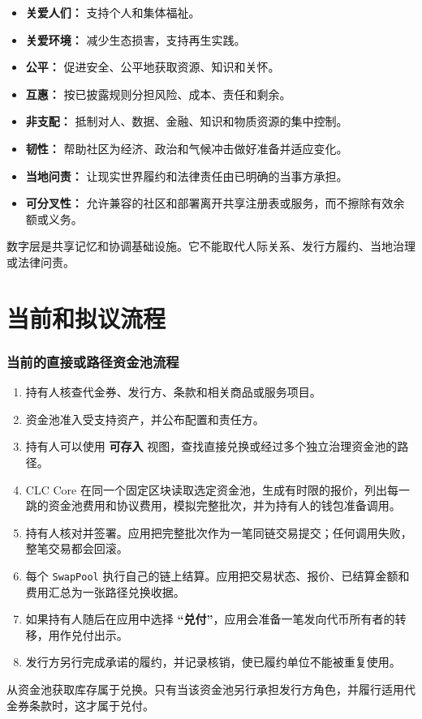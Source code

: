\documentclass[11pt]{article}
\begin{document}
\begin{itemize}[leftmargin=*]
\item \textbf{关爱人们：} 支持个人和集体福祉。
\item \textbf{关爱环境：} 减少生态损害，支持再生实践。
\item \textbf{公平：} 促进安全、公平地获取资源、知识和关怀。
\item \textbf{互惠：} 按已披露规则分担风险、成本、责任和剩余。
\item \textbf{非支配：} 抵制对人、数据、金融、知识和物质资源的集中控制。
\item \textbf{韧性：} 帮助社区为经济、政治和气候冲击做好准备并适应变化。
\item \textbf{当地问责：} 让现实世界履约和法律责任由已明确的当事方承担。
\item \textbf{可分叉性：} 允许兼容的社区和部署离开共享注册表或服务，而不擦除有效余额或义务。
\end{itemize}
数字层是共享记忆和协调基础设施。它不能取代人际关系、发行方履约、当地治理或法律问责。

\section*{当前和拟议流程}

\subsubsection*{当前的直接或路径资金池流程}

\begin{enumerate}[leftmargin=*]
\item 持有人核查代金券、发行方、条款和相关商品或服务项目。
\item 资金池准入受支持资产，并公布配置和责任方。
\item 持有人可以使用 \textbf{可存入} 视图，查找直接兑换或经过多个独立治理资金池的路径。
\item CLC Core 在同一个固定区块读取选定资金池，生成有时限的报价，列出每一跳的资金池费用和协议费用，模拟完整批次，并为持有人的钱包准备调用。
\item 持有人核对并签署。应用把完整批次作为一笔同链交易提交；任何调用失败，整笔交易都会回滚。
\item 每个 \texttt{SwapPool} 执行自己的链上结算。应用把交易状态、报价、已结算金额和费用汇总为一张路径兑换收据。
\item 如果持有人随后在应用中选择 \textbf{``兑付''}，应用会准备一笔发向代币所有者的转移，用作兑付出示。
\item 发行方另行完成承诺的履约，并记录核销，使已履约单位不能被重复使用。
\end{enumerate}
从资金池获取库存属于兑换。只有当该资金池另行承担发行方角色，并履行适用代金券条款时，这才属于兑付。
\end{document}
